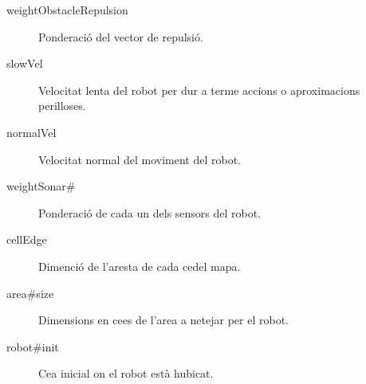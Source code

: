\begin{description}
  \item[weightObstacleRepulsion] Ponderació del vector de repulsió.
  \item[slowVel] Velocitat lenta del robot per dur a terme accions o aproximacions perilloses.
  \item[normalVel] Velocitat normal del moviment del robot.
  \item[weightSonar\#] Ponderació de cada un dels sensors del robot.
  \item[cellEdge] Dimenció de l'aresta de cada ce\lgem del mapa.
  \item[area\#size] Dimensions en ce\lgem es de l'area a netejar per el robot.
  \item[robot\#init] Ce\lgem a inicial on el robot està hubicat.
\end{description}

